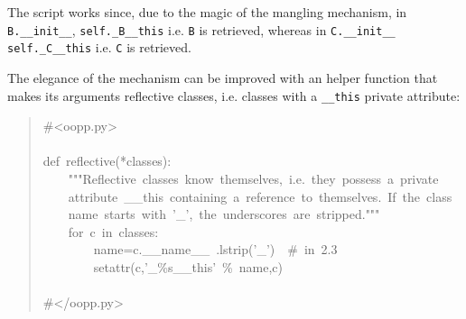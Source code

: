 \documentclass[10pt,english]{article}
\begin{document}
The script works since, due to the magic of the mangling mechanism,
in \texttt{B.{\_}{\_}init{\_}{\_}}, \texttt{self.{\_}B{\_}{\_}this} i.e. \texttt{B} is retrieved, whereas in 
\texttt{C.{\_}{\_}init{\_}{\_}} \texttt{self.{\_}C{\_}{\_}this} i.e. \texttt{C} is retrieved.

The elegance of the mechanism can be improved with an helper function
that makes its arguments reflective classes, i.e. classes with a
\texttt{{\_}{\_}this} private attribute:
\begin{quote}
\begin{ttfamily}\begin{flushleft}
\mbox{{\#}<oopp.py>}\\
\mbox{}\\
\mbox{def~reflective(*classes):}\\
\mbox{~~~~"""Reflective~classes~know~themselves,~i.e.~they~possess~a~private}\\
\mbox{~~~~attribute~{\_}{\_}this~containing~a~reference~to~themselves.~If~the~class}\\
\mbox{~~~~name~starts~with~'{\_}',~the~underscores~are~stripped."""}\\
\mbox{~~~~for~c~in~classes:}\\
\mbox{~~~~~~~~name=c.{\_}{\_}name{\_}{\_}~.lstrip('{\_}')~~{\#}~in~2.3}\\
\mbox{~~~~~~~~setattr(c,'{\_}{\%}s{\_}{\_}this'~{\%}~name,c)~}\\
\mbox{}\\
\mbox{{\#}</oopp.py>}
\end{flushleft}\end{ttfamily}
\end{quote}
\end{document}
